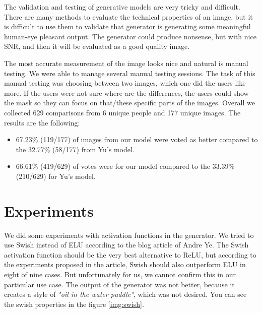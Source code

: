 \documentclass[a4paper, 11pt]{article}
\begin{document}
The validation and testing of generative models are very tricky and difficult.
There are many methods to evaluate the technical properties of an image, but it is difficult to use them to validate that generator is generating some meaningful human-eye pleasant output. 
The generator could produce nonsense, but with nice SNR, and then it will be evaluated as a good quality image.

The most accurate measurement of the image looks nice and natural is manual testing. We were able to manage several manual testing sessions. The task of this manual testing was choosing between two images, which one did the users like more. If the users were not sure where are the differences, the users could show the mask so they can focus on that/these specific parts of the images.
Overall we collected 629 comparisons from 6 unique people and 177 unique images.
The results are the following:
\begin{itemize}
    \item 67.23\% (119/177) of images from our model were voted as better compared to the 32.77\% (58/177) from Yu's model.
    \item 66.61\% (419/629) of votes were for our model compared to the 33.39\% (210/629) for Yu's model.
\end{itemize}

\section{Experiments}
\label{section:experiments}
We did some experiments with activation functions in the generator. We tried to use Swish instead of ELU according to the blog article of Andre Ye\cite{Ye_swish}. The Swish activation function should be the very best alternative to ReLU, but according to the experiments proposed in the article, Swish should also outperform ELU in eight of nine cases. But unfortunately for us, we cannot confirm this in our particular use case. The output of the generator was not better, because it creates a style of \textit{"oil in the water puddle"}, which was not desired.
You can see the swish properties in the figure \ref{img:swish}.
\end{document}

